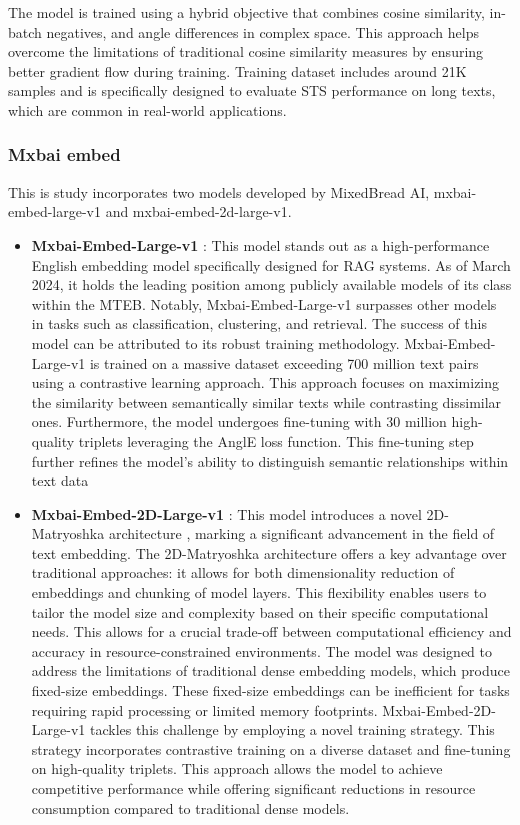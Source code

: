 The model is trained using a hybrid objective that combines cosine similarity, in-batch negatives, and angle differences in complex space.
This approach helps overcome the limitations of traditional cosine similarity measures by ensuring better gradient flow during training.
Training dataset includes around 21K samples and is specifically designed to evaluate \ac{STS} performance on long texts, which are common in real-world applications.

\subsubsection{Mxbai embed}
This is study incorporates two models developed by MixedBread AI, mxbai-embed-large-v1 and mxbai-embed-2d-large-v1. 
\begin{itemize}
  \item \textbf{Mxbai-Embed-Large-v1} \cite{emb2024mxbai}:
    This model stands out as a high-performance English embedding model specifically designed for \ac{RAG} systems.
    As of March 2024, it holds the leading position among publicly available models of its class within the \ac{MTEB}.
    Notably, Mxbai-Embed-Large-v1 surpasses other models in tasks such as classification, clustering, and retrieval.
    The success of this model can be attributed to its robust training methodology.
    Mxbai-Embed-Large-v1 is trained on a massive dataset exceeding 700 million text pairs using a contrastive learning approach.
    This approach focuses on maximizing the similarity between semantically similar texts while contrasting dissimilar ones.
    Furthermore, the model undergoes fine-tuning with 30 million high-quality triplets leveraging the AnglE loss function.
    This fine-tuning step further refines the model's ability to distinguish semantic relationships within text data
  \item \textbf{Mxbai-Embed-2D-Large-v1} \cite{emb2024mxbai2d}:
    This model introduces a novel 2D-Matryoshka architecture \cite{li20242d}, marking a significant advancement in the field of text embedding.
    The 2D-Matryoshka architecture offers a key advantage over traditional approaches: it allows for both dimensionality reduction of embeddings and chunking of model layers.
    This  flexibility enables users to tailor the model size and complexity based on their specific computational needs.
    This allows for a crucial trade-off between computational efficiency and accuracy in resource-constrained environments.
    The model was designed to address the limitations of traditional dense embedding models, which produce fixed-size embeddings.
    These fixed-size embeddings can be inefficient for tasks requiring rapid processing or limited memory footprints.
    Mxbai-Embed-2D-Large-v1 tackles this challenge by employing a novel training strategy.
    This strategy incorporates contrastive training on a diverse dataset and fine-tuning on high-quality triplets.
    This approach allows the model to achieve competitive performance while offering significant reductions in resource consumption compared to traditional dense models.
\end{itemize}

